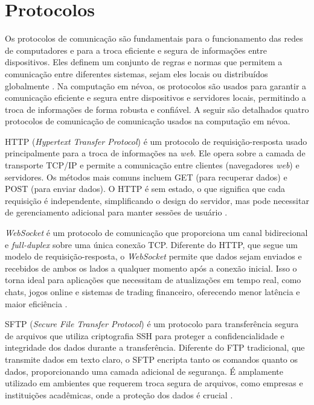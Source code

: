 \section{Protocolos}

Os protocolos de comunicação são fundamentais para o funcionamento das redes de computadores e para a troca eficiente e segura de informações entre dispositivos. Eles definem um conjunto de regras e normas que permitem a comunicação entre diferentes sistemas, sejam eles locais ou distribuídos globalmente \cite{tanenbaum2011}. Na computação em névoa, os protocolos são usados para garantir a comunicação eficiente e segura entre dispositivos e servidores locais, permitindo a troca de informações de forma robusta e confiável. A seguir são detalhados quatro protocolos de comunicação de comunicação usados na computação em névoa.

\gls{HTTP} (\textit{Hypertext Transfer Protocol}) é um protocolo de requisição-resposta usado principalmente para a troca de informações na \textit{web}. Ele opera sobre a camada de transporte \gls{TCP/IP} e permite a comunicação entre clientes (navegadores \textit{web}) e servidores. Os métodos mais comuns incluem GET (para recuperar dados) e POST (para enviar dados). O HTTP é sem estado, o que significa que cada requisição é independente, simplificando o design do servidor, mas pode necessitar de gerenciamento adicional para manter sessões de usuário \cite{gourley2002}.

\textit{WebSocket} é um protocolo de comunicação que proporciona um canal bidirecional e \textit{full-duplex} sobre uma única conexão \gls{TCP}. Diferente do \gls{HTTP}, que segue um modelo de requisição-resposta, o \textit{WebSocket} permite que dados sejam enviados e recebidos de ambos os lados a qualquer momento após a conexão inicial. Isso o torna ideal para aplicações que necessitam de atualizações em tempo real, como chats, jogos online e sistemas de trading financeiro, oferecendo menor latência e maior eficiência \cite{wang2013}.

\gls{SFTP} (\textit{Secure File Transfer Protocol}) é um protocolo para transferência segura de arquivos que utiliza criptografia \gls{SSH} para proteger a confidencialidade e integridade dos dados durante a transferência. Diferente do \gls{FTP} tradicional, que transmite dados em texto claro, o \gls{SFTP} encripta tanto os comandos quanto os dados, proporcionando uma camada adicional de segurança. É amplamente utilizado em ambientes que requerem troca segura de arquivos, como empresas e instituições acadêmicas, onde a proteção dos dados é crucial \cite{barrett2005}.


